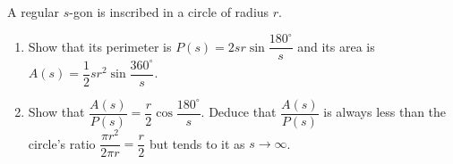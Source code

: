 A regular $s$-gon is inscribed in a circle of radius $r$.
\begin{enumerate}
\item[(a)] Show that its perimeter is $P(s)=2sr\sin\dfrac{180^\circ}s$ and its area is $A(s)=\dfrac12sr^2\sin\dfrac{360^\circ}s$.
\item[(b)] Show that $\dfrac{A(s)}{P(s)}=\dfrac r2\cos\dfrac{180^\circ}s$. Deduce that $\dfrac{A(s)}{P(s)}$ is always less than the circle's ratio $\dfrac{\pi r^2}{2\pi r}=\dfrac r2$ but tends to it as $s\to\infty$.
\end{enumerate}
